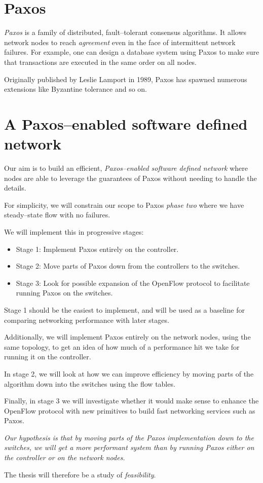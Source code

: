 \section{Paxos}

{\em Paxos} \cite{Lamport:1998:PP:279227.279229} is a family of
distributed, fault--tolerant consensus algorithms.  It allows network nodes
to reach {\em agreement} even in the face of intermittent network failures.
For example, one can design a database system using Paxos to make sure that
transactions are executed in the same order on all nodes.

Originally published by Leslie Lamport in 1989, Paxos
has spawned numerous extensions like Byzantine tolerance and so on.

\section{A Paxos--enabled software defined network}

Our aim is to build an efficient, {\em Paxos--enabled software defined
network} where nodes are able to leverage the guarantees of Paxos without
needing to handle the details.

For simplicity, we will constrain our scope to Paxos {\em phase two} where
we have steady--state flow with no failures.

We will implement this in progressive stages:

\begin{itemize}
\item Stage 1: Implement Paxos entirely on the controller.
\item Stage 2: Move parts of Paxos down from the controllers to the
switches.
\item Stage 3: Look for possible expansion of the OpenFlow protocol to
facilitate running Paxos on the switches.
\end{itemize}

Stage 1 should be the easiest to implement, and will be used as a baseline
for comparing networking performance with later stages.

Additionally, we will implement Paxos entirely on the network nodes, using
the same topology, to get an idea of how much of a performance hit we take
for running it on the controller.

In stage 2, we will look at how we can improve efficiency by moving parts of
the algorithm down into the switches using the flow tables.

Finally, in stage 3 we will investigate whether it would make sense to
enhance the OpenFlow protocol with new primitives to build fast
networking services such as Paxos.

{\em 
  Our hypothesis is that by moving parts of the Paxos implementation down to
  the switches, we will get a more performant system than by running Paxos
  either on the controller or on the network nodes.
}

The thesis will therefore be a study of {\em feasibility}.

